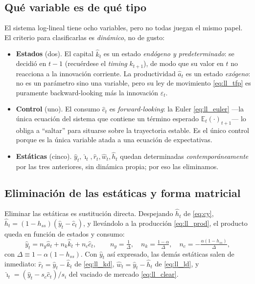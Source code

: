 \documentclass[11pt,a4paper]{report}
\newcommand{\E}{\mathbb{E}}
\begin{document}
\subsection{Qué variable es de qué tipo}

El sistema log-lineal tiene ocho variables, pero no todas juegan el mismo papel.
El criterio para clasificarlas es \emph{dinámico}, no de gusto:
\begin{itemize}
\item \textbf{Estados} (dos). El capital $\hat{k}_t$ es un estado \emph{endógeno
  y predeterminado}: se decidió en $t-1$ (recuérdese el \emph{timing}
  $k_{t+1}$), de modo que su valor en $t$ no reacciona a la innovación corriente.
  La productividad $\hat{a}_t$ es un estado \emph{exógeno}: no es un parámetro
  sino una variable, pero su ley de movimiento \eqref{eq:ll_tfp} es puramente
  backward-looking más la innovación $\varepsilon_t$.
\item \textbf{Control} (uno). El consumo $\hat{c}_t$ es \emph{forward-looking}:
  la Euler \eqref{eq:ll_euler} ---la única ecuación del sistema que contiene un
  término esperado $\E_t(\cdot)_{t+1}$--- lo obliga a ``saltar'' para situarse
  sobre la trayectoria estable. Es el único control porque es la única variable
  atada a una ecuación de expectativas.
\item \textbf{Estáticas} (cinco). $\hat{y}_t,\hat{\imath}_t,\hat{r}_t,\hat{w}_t,\hat{h}_t$
  quedan determinadas \emph{contemporáneamente} por las tres anteriores, sin
  dinámica propia; por eso las eliminamos.
\end{itemize}

\subsection{Eliminación de las estáticas y forma matricial}

Eliminar las estáticas es sustitución directa. Despejando $\hat{h}_t$ de
\eqref{eq:cy}, $\hat{h}_t=(1-h_{ss})(\hat{y}_t-\hat{c}_t)$, y llevándolo a la
producción \eqref{eq:ll_prod}, el producto queda en función de estados y consumo:
\begin{equation}
\hat{y}_t=n_y\hat{a}_t+n_k\hat{k}_t+n_c\hat{c}_t,\qquad
n_y=\tfrac{1}{\Delta},\quad n_k=\tfrac{1-\alpha}{\Delta},\quad
n_c=-\tfrac{\alpha(1-h_{ss})}{\Delta}, \label{eq:ncoefs}
\end{equation}
con $\Delta\equiv 1-\alpha(1-h_{ss})$. Con $\hat{y}_t$ así expresado, las demás
estáticas salen de inmediato: $\hat{r}_t=\hat{y}_t-\hat{k}_t$ de
\eqref{eq:ll_kd}, $\hat{w}_t=\hat{y}_t-\hat{h}_t$ de \eqref{eq:ll_ld}, y
$\hat{\imath}_t=(\hat{y}_t-s_c\hat{c}_t)/s_i$ del vaciado de mercado
\eqref{eq:ll_clear}.
\end{document}
